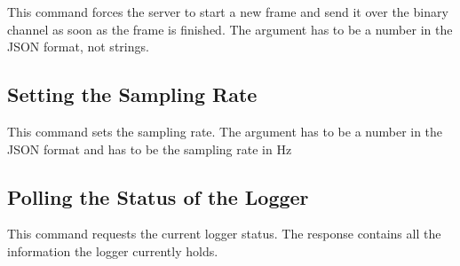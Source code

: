 This command  forces the  server to  start a new  frame and  send it  over the
binary channel as soon as the  frame is finished.  The  argument
has to be a number in the JSON format, not strings.


\subsection{Setting the Sampling Rate} %
\label{subsec:devguide:server:set_sampling_rate}

This command sets the  sampling rate.  The argument has to be  a number in the
JSON format and has to be the sampling rate in \si{\Hz}


\subsection{Polling the Status of the Logger} %
\label{subsec:devguide:server:polling_logger}

This command  requests the current  logger status.  The response  contains all
the information the logger currently holds.

